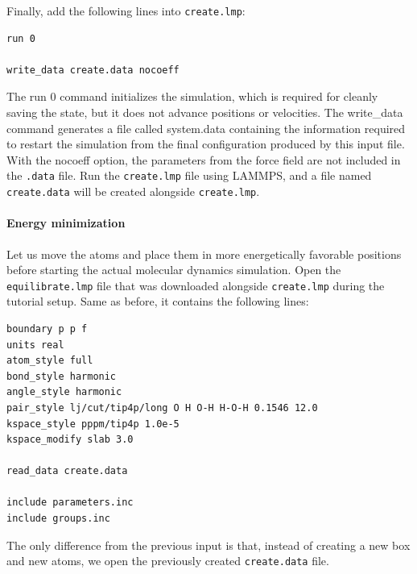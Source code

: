 \documentclass[9pt,tutorial]{livecoms}
\newcommand{\lmpcmd}[1]{\colorbox{listing}{\textcolor{command}{\small{#1}}}} %
\newcommand{\flecmd}[1]{\textcolor{command}{\texttt{#1}}} %
\begin{document}
Finally, add the following lines into \flecmd{create.lmp}:
\begin{lstlisting}
run 0

write_data create.data nocoeff
\end{lstlisting}
The \lmpcmd{run 0} command initializes the simulation, which is required for
cleanly saving the state, but it
does not advance positions or velocities.  The \lmpcmd{write\_data} command
generates a file called \lmpcmd{system.data} containing the information required
to restart the simulation from the final configuration produced by this input
file.  With the \lmpcmd{nocoeff} option, the parameters from the force field are
not included in the \flecmd{.data} file.  Run the \flecmd{create.lmp} file using LAMMPS,
and a file named \flecmd{create.data} will be created alongside \flecmd{create.lmp}.

\paragraph{Energy minimization}

Let us move the atoms and place them in more energetically favorable positions
before starting the actual molecular dynamics simulation.
Open the \flecmd{equilibrate.lmp} file that was downloaded alongside
\flecmd{create.lmp} during the tutorial setup.  Same as
before, it contains the following lines:
\begin{lstlisting}
boundary p p f
units real
atom_style full
bond_style harmonic
angle_style harmonic
pair_style lj/cut/tip4p/long O H O-H H-O-H 0.1546 12.0
kspace_style pppm/tip4p 1.0e-5
kspace_modify slab 3.0

read_data create.data

include parameters.inc
include groups.inc
\end{lstlisting}
The only difference from the previous input is that, instead of creating a new
box and new atoms, we open the previously created \flecmd{create.data} file.
\end{document}

